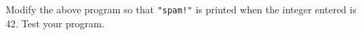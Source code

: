 Modify the above program so that \verb~"spam!"~ is printed when the integer entered is 42. Test your program.

